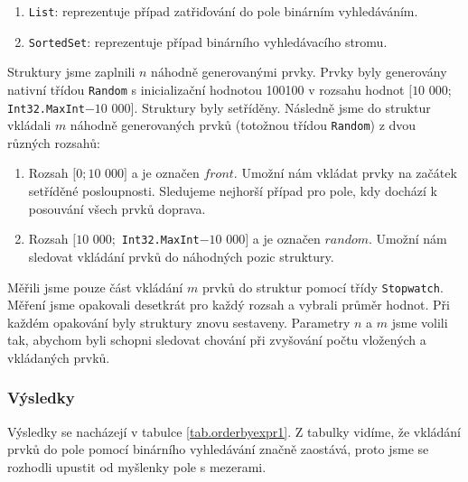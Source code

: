 \begin{enumerate}
\item \texttt{List}: reprezentuje případ zatřiďování do pole binárním vyhledáváním.
\item \texttt{SortedSet}: reprezentuje případ binárního vyhledávacího stromu.
\end{enumerate}
Struktury jsme zaplnili $n$ náhodně generovanými prvky.
Prvky byly generovány nativní třídou \texttt{Random} s inicializační hodnotou 100100 v rozsahu hodnot $[10$ 000; \texttt{Int32.MaxInt}$ - 10$ $000]$.
Struktury byly setříděny.
Následně jsme do struktur vkládali $m$ náhodně generovaných prvků (totožnou třídou \texttt{Random}) z dvou různých rozsahů:

\begin{enumerate}
\item Rozsah $[0; 10$ $000]$ a je označen $front$. 
Umožní nám vkládat prvky na začátek setříděné posloupnosti. 
Sledujeme nejhorší případ pro pole, kdy dochází k posouvání všech prvků doprava.
\item Rozsah $[10$ $000;$ \texttt{Int32.MaxInt}$ - 10$ $000]$ a je označen $random$.
Umožní nám sledovat vkládání prvků do náhodných pozic struktury.
\end{enumerate}
Měřili jsme pouze část vkládání $m$ prvků do struktur pomocí třídy \texttt{Stopwatch}.
Měření jsme opakovali desetkrát pro každý rozsah a vybrali průměr hodnot.
Při každém opakování byly struktury znovu sestaveny.
Parametry $n$ a $m$ jsme volili tak, abychom byli schopni sledovat chování při zvyšování počtu vložených a vkládaných prvků. 

\subsubsection{Výsledky}

Výsledky se nacházejí v tabulce \ref{tab.orderbyexpr1}.
Z tabulky vidíme, že vkládání prvků do pole pomocí binárního vyhledávání značně zaostává, proto jsme se rozhodli upustit od myšlenky pole s mezerami.

